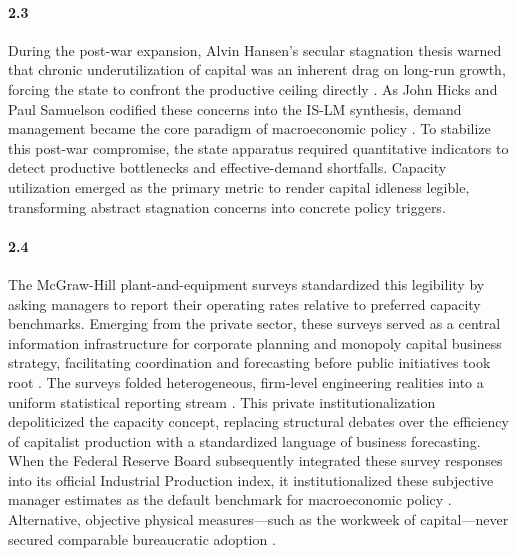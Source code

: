 \paragraph{2.3}
During the post-war expansion, Alvin Hansen’s secular stagnation thesis warned that chronic underutilization of capital was an inherent drag on long-run growth, forcing the state to confront the productive ceiling directly \citep{Hansen1936, Hansen1941, Barber1987}. As John Hicks and Paul Samuelson codified these concerns into the IS-LM synthesis, demand management became the core paradigm of macroeconomic policy \citep{Hicks1937, Samuelson1947, Samuelson1948}. To stabilize this post-war compromise, the state apparatus required quantitative indicators to detect productive bottlenecks and effective-demand shortfalls. Capacity utilization emerged as the primary metric to render capital idleness legible, transforming abstract stagnation concerns into concrete policy triggers.

\paragraph{2.4}
The McGraw-Hill plant-and-equipment surveys standardized this legibility by asking managers to report their operating rates relative to preferred capacity benchmarks. Emerging from the private sector, these surveys served as a central information infrastructure for corporate planning and monopoly capital business strategy, facilitating coordination and forecasting before public initiatives took root \citep{BaranSweezy1988, Munroe2007}. The surveys folded heterogeneous, firm-level engineering realities into a uniform statistical reporting stream \citep{Butler1958, Phillips1963}. This private institutionalization depoliticized the capacity concept, replacing structural debates over the efficiency of capitalist production with a standardized language of business forecasting. When the Federal Reserve Board subsequently integrated these survey responses into its official Industrial Production index, it institutionalized these subjective manager estimates as the default benchmark for macroeconomic policy \citep{Board2017}. Alternative, objective physical measures—such as the workweek of capital—never secured comparable bureaucratic adoption \citep{Foss1963, TaubmanGottschalk1971}.

